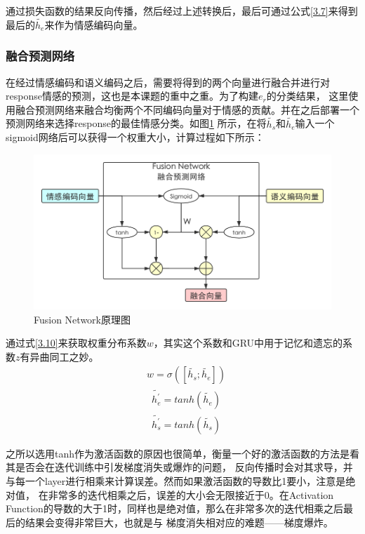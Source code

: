 \documentclass[supercite]{HustGraduPaper}
\theoremstyle{definition}
\begin{document}
通过损失函数的结果反向传播，然后经过上述转换后，最后可通过公式\ref{3.7}来得到最后的$\widetilde{h_e}$来作为情感编码向量。

\subsubsection{融合预测网络}
在经过情感编码和语义编码之后，需要将得到的两个向量进行融合并进行对response情感的预测，这也是本课题的重中之重。为了构建$e_r$的分类结果，
这里使用融合预测网络来融合均衡两个不同编码向量对于情感的贡献。并在之后部署一个预测网络来选择response的最佳情感分类。如图\ref{Fig.fusionnetwork}
所示，在将$\widetilde{h_s}$和$\widetilde{h_e}$输入一个sigmoid网络后可以获得一个权重大小，计算过程如下所示：

\begin{figure}[htbp] %
  \centering %
  \includegraphics[width=1\textwidth]{images/fusionnetwork.png} %
  \caption{Fusion Network原理图} %
  \label{Fig.fusionnetwork} %
\end{figure}
通过式\ref{3.10}来获取权重分布系数$w$，其实这个系数和GRU中用于记忆和遗忘的系数$z$有异曲同工之妙。
\begin{align}
  &w = \sigma([\widetilde{h_s};\widetilde{h_e}]) \label{3.10}
\end{align}
\begin{align}
  &{\widetilde{h_e^{'}}} = tanh(\widetilde{h_e}) \label{3.11}\\
  &{\widetilde{h_s^{'}}} = tanh(\widetilde{h_s}) \label{3.12}
\end{align}

之所以选用tanh作为激活函数的原因也很简单，衡量一个好的激活函数的方法是看其是否会在迭代训练中引发梯度消失或爆炸的问题，
反向传播时会对其求导，并与每一个layer进行相乘来计算误差。然而如果激活函数的导数比1要小，注意是绝对值，
在非常多的迭代相乘之后，误差的大小会无限接近于0。在Activation Function的导数的大于1时，同样也是绝对值，那么在非常多次的迭代相乘之后最后的结果会变得非常巨大，也就是与
梯度消失相对应的难题——梯度爆炸。
\end{document}
